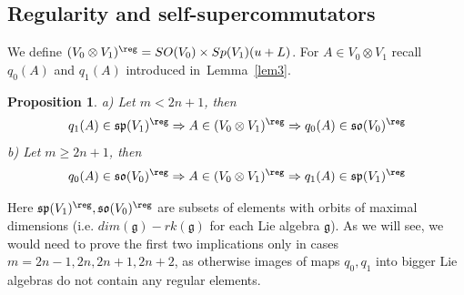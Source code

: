 \documentclass[12pt]{amsart}
\newtheorem{prop}[thm]{Proposition}
\theoremstyle{definition}
\theoremstyle{remark}
\numberwithin{equation}{subsection}
\begin{document}
\subsection{Regularity and self-supercommutators}
We define $(V_0\otimes V_1)^{\reg}=SO(V_0)\times Sp(V_1)(u+L)$. For $A\in V_0 \otimes V_1$ recall
$q_0(A)$ and $q_1(A)$ introduced in~Lemma~\ref{lem3}.
\begin{prop}
  \label{prop2}
\textup{a)} Let $m< 2n+1$, then 
\begin{equation}
    q_1(A)\in \mathfrak{sp}(V_1)^{\reg} \Rightarrow A \in (V_0\otimes V_1)^{\reg} \Rightarrow q_0(A)\in \mathfrak{so}(V_0)^{\reg}
\end{equation}
\textup{b)} Let $m \ge 2n+1$, then
\begin{equation}
    q_0(A)\in \mathfrak{so}(V_0)^{\reg} \Rightarrow A \in (V_0\otimes V_1)^{\reg} \Rightarrow q_1(A)\in \mathfrak{sp}(V_1)^{\reg}
\end{equation}
\end{prop}
Here $\mathfrak{sp}(V_1)^{\reg},\mathfrak{so}(V_0)^{\reg}$ are subsets of elements with orbits of maximal dimensions (i.e. $dim(\mathfrak{g})-rk(\mathfrak{g})$ for each Lie algebra $\mathfrak{g}$).
As we will see, we would need to prove the first two implications only in cases $m=2n-1,2n,2n+1,2n+2$, as otherwise images of maps $q_0,q_1$ into bigger Lie algebras do not contain any regular elements.
\end{document}
